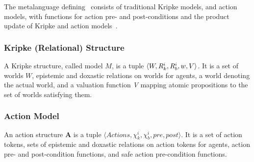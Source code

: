 The metalanguage defining \DASL\ consists of traditional Kripke models, and action models, with functions for action pre- and post-conditions and the product update of Kripke and action models~\cite{DEL}.

\subsubsection{Kripke (Relational) Structure}%
A Kripke structure, called model $M$, is a tuple $\langle W, R_{k}^i, R_{b}^i, w, V \rangle$. It is a set of worlds $W$, epistemic and doxastic relations on worlds for agents, a world denoting the actual world, and a valuation function \emph{V} mapping atomic propositions to the set of worlds satisfying them.

\subsubsection{Action Model}
An action structure $\mathbf{A}$ is a tuple $\langle Actions,\chi_{k}^i, \chi_{b}^i, pre, post \rangle$. It is a set of action tokens, sets of epistemic and doxastic relations on action tokens for agents, action pre- and post-condition functions, and safe action pre-condition functions.  

